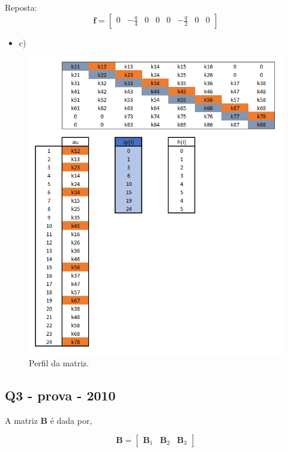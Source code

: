 \color{blue}
Reposta:
\begin{equation}
	\mathbf{f} = \begin{bmatrix}0 & -\frac{q}{4} & 0 & 0 & 0 & -\frac{q}{2} & 0 & 0 \end{bmatrix}	
\end{equation}
\color{black}
%
\begin{itemize}
	\item c)	
\end{itemize}
%
\begin{figure}[H]
	\includegraphics[width=1.0\textwidth,center]{fig/q2_prova2010_c.PNG}
	\caption{Perfil da matriz.} 
\end{figure}

\subsection{Q3 - prova - 2010}

A matriz $\mathbf{B}$ é dada por,

\begin{equation}
	\mathbf{B} =
	\begin{bmatrix}
	\mathbf{B}_1&  \mathbf{B}_2& \mathbf{B}_3
	\end{bmatrix}
\end{equation} 

